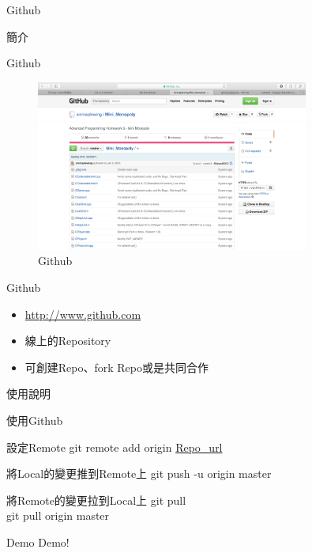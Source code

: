 \documentclass[pdf,16pt]{beamer}
\begin{document}
   \begin{section}{Github}
    \begin{subsection}{簡介}
      \begin{frame}{Github}
        \begin{figure}[h!]
          \includegraphics[width=0.8\textwidth]{images/005.png} 
          \caption{Github}
        \end{figure}
      \end{frame}
      
      \begin{frame}{Github}
        \begin{itemize}
          \item \url{http://www.github.com}
          \item 線上的Repository
          \item 可創建Repo、fork Repo或是共同合作
        \end{itemize}
      \end{frame}
    \end{subsection}
    
    \begin{subsection}{使用說明}
      \begin{frame}{使用Github}
        \begin{block}{設定Remote}
          git remote add origin \url{Repo_url}
        \end{block}
        
        \begin{block}{將Local的變更推到Remote上}
          git push -u origin master
        \end{block}
        
        \begin{block}{將Remote的變更拉到Local上}
          git pull\\
          git pull origin master
        \end{block}
        
      \end{frame}
      
      \begin{frame}{Demo}
        Demo!
      \end{frame}
     
    \end{subsection}
    
   \end{section}
   
\end{document}
